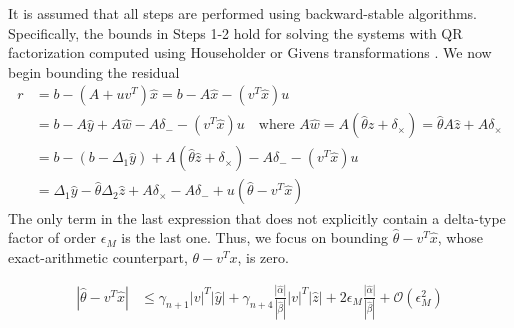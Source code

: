 \documentclass{siamltex}
\newcommand{\eps}{\epsilon}
\begin{document}
It is assumed that all steps are performed using backward-stable algorithms. Specifically, the bounds in Steps 1-2 hold for solving the systems with QR factorization computed using Householder or Givens transformations \cite[pp. 361-368]{Higham02}. We now begin bounding the residual
\begin{align}
r &= b - (A+uv^T) \hat x = b - A\hat x - (v^T \hat x) u \nonumber \\
& = b - A\hat y + A \hat w - A \delta_{-} - (v^T \hat x) u \quad \mbox{where } A \hat w = A (\hat \theta \hat z + \delta_{\times}) = \hat \theta A \hat z + A \delta_{\times} \nonumber \\
& = b - ( b - \Delta_1 \hat y) + A (\hat \theta \hat z + \delta_{\times}) - A \delta_{-} - (v^T \hat x) u \nonumber \\
& =  \Delta_1 \hat y - \hat \theta \Delta_2 \hat z  + A \delta_{\times} - A \delta_{-} + u (\hat \theta - v^T \hat x) \label{res_temp:eq}
\end{align}
The only term in the last expression that does not explicitly contain a delta-type factor of order $\eps_M$ is the last one. Thus, we focus on bounding $\hat \theta - v^T \hat x$, whose exact-arithmetic counterpart, $\theta - v^T x$, is zero.
\begin{lemma} \label{thetaZ:lem}
\begin{align*}
|\hat \theta - v^T \hat x| & \leq \gamma_{n+1} |v|^T |\hat y| +
 \gamma_{n+4} \frac{|\hat \alpha|}{|\hat \beta|} |v|^T |\hat z| + 2 \eps_M \frac{|\hat \alpha|}{|\hat \beta|}  + \mathcal{O}(\eps_M^2)
\end{align*}
\end{lemma}
\end{document}
